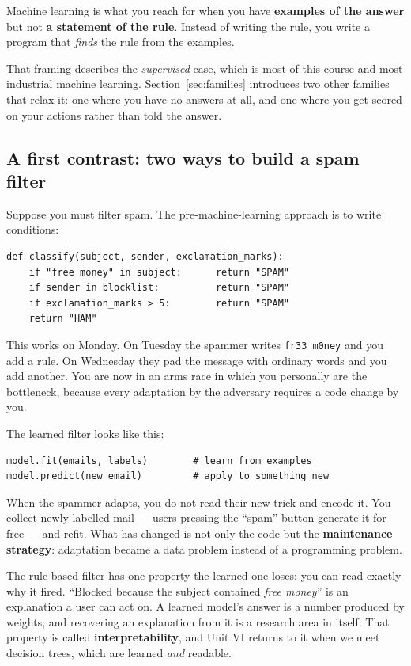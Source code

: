 \documentclass[11pt]{article}
\begin{document}
\begin{keyidea}
Machine learning is what you reach for when you have \textbf{examples of the
answer} but not \textbf{a statement of the rule}. Instead of writing the rule,
you write a program that \emph{finds} the rule from the examples.
\end{keyidea}

That framing describes the \emph{supervised} case, which is most of this course
and most industrial machine learning. Section~\ref{sec:families} introduces two
other families that relax it: one where you have no answers at all, and one
where you get scored on your actions rather than told the answer.

\subsection{A first contrast: two ways to build a spam filter}

Suppose you must filter spam. The pre-machine-learning approach is to write
conditions:

\begin{lstlisting}
def classify(subject, sender, exclamation_marks):
    if "free money" in subject:      return "SPAM"
    if sender in blocklist:          return "SPAM"
    if exclamation_marks > 5:        return "SPAM"
    return "HAM"
\end{lstlisting}

This works on Monday. On Tuesday the spammer writes \texttt{fr33 m0ney} and you
add a rule. On Wednesday they pad the message with ordinary words and you add
another. You are now in an arms race in which you personally are the bottleneck,
because every adaptation by the adversary requires a code change by you.

The learned filter looks like this:

\begin{lstlisting}
model.fit(emails, labels)        # learn from examples
model.predict(new_email)         # apply to something new
\end{lstlisting}

When the spammer adapts, you do not read their new trick and encode it. You
collect newly labelled mail --- users pressing the ``spam'' button generate it
for free --- and refit. What has changed is not only the code but the
\textbf{maintenance strategy}: adaptation became a data problem instead of a
programming problem.

\begin{caution}
The rule-based filter has one property the learned one loses: you can read
exactly why it fired. ``Blocked because the subject contained \emph{free
money}'' is an explanation a user can act on. A learned model's answer is a
number produced by weights, and recovering an explanation from it is a research
area in itself. That property is called \textbf{interpretability}, and Unit VI
returns to it when we meet decision trees, which are learned \emph{and}
readable.
\end{caution}
\end{document}

